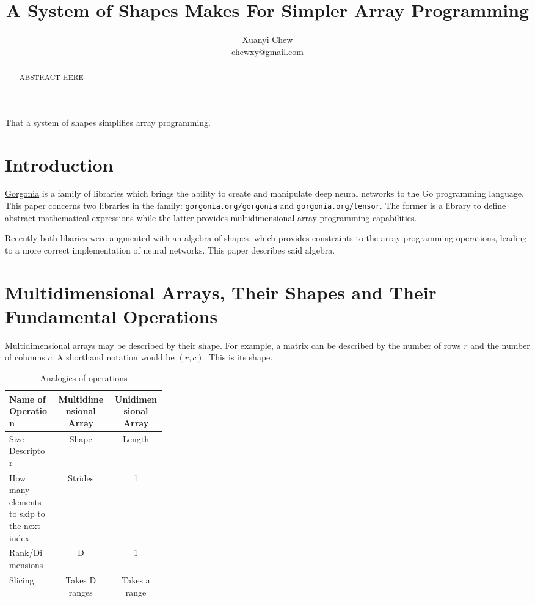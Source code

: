 \documentclass{article}
\begin{document}
\title{A System of Shapes Makes For Simpler Array Programming}
\author{Xuanyi Chew \\
  \mbox{}
  chewxy@gmail.com
}
\maketitle

\begin{abstract}
  ABSTRACT HERE
\end{abstract}

That a system of shapes simplifies array programming.

\section{Introduction}

\href{https://gorgonia.org}{Gorgonia} is a family of libraries which brings the ability to create and manipulate deep neural networks to the Go programming language. This paper concerns two libraries in the family: \texttt{gorgonia.org/gorgonia} and \texttt{gorgonia.org/tensor}. The former is a library to define abstract mathematical expressions while the latter provides multidimensional array programming capabilities.

Recently both libaries were augmented with an algebra of shapes, which provides constraints to the array programming operations, leading to a more correct implementation of neural networks. This paper describes said algebra.


\section{Multidimensional Arrays, Their Shapes and Their Fundamental Operations}

Multidimensional arrays may be described by their shape. For example, a matrix can be described by the number of rows $r$ and the number of columns $c$. A shorthand notation would be $(r, c)$. This is its shape.

\begin{table}[ht]
  \centering
  \begin{tabular}{|p{0.3\linewidth}|c|c|}
    \hline
    Name of Operation & Multidimensional Array & Unidimensional Array \\
    \hline
     Size Descriptor & Shape & Length \\
    \hline
    How many elements to skip to the next index & Strides & 1 \\
    \hline
    Rank/Dimensions & D & 1 \\
    \hline
    Slicing & Takes D ranges & Takes a range\\
    \hline
  \end{tabular}
\caption{Analogies of operations}
\label{analogies}
\end{table}
\end{document}

